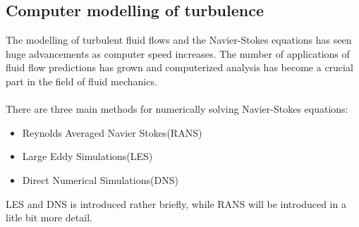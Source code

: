 \documentclass[a4paper, 12pt]{report}
\begin{document}
\subsection{Computer modelling of turbulence}
The modelling of turbulent fluid flows and the Navier-Stokes equations has seen huge advancements as computer speed increases. The number of applications of fluid flow predictions has grown and computerized analysis has become a crucial part in the field of fluid mechanics.\\
\\
There are three main methods for numerically solving Navier-Stokes equations:
\begin{itemize}
	\item Reynolds Averaged Navier Stokes(RANS)
	\item  Large Eddy Simulations(LES)
	\item  Direct Numerical Simulations(DNS)
\end{itemize}
LES and DNS is introduced rather briefly, while RANS will be introduced in a litle bit more detail.
\end{document}
